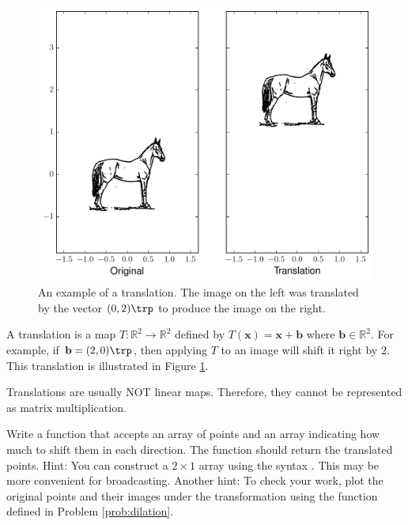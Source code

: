 \begin{figure}
\includegraphics[width=\textwidth]{translate.pdf}
\caption{
An example of a translation.
The image on the left was translated by the vector $(0, 2)\trp$ to produce the image on the right.}
\label{fig:translation}
\end{figure}

A translation is a map $T: \mathbb{R}^2 \rightarrow \mathbb{R}^2$ defined by $T(\mathbf{x}) = \mathbf{x}+\mathbf{b}$ where $\mathbf{b} \in \mathbb{R}^2$. 
For example, if $\mathbf{b} = (2, 0)\trp$, then applying $T$ to an image will shift it right by 2. 
This translation is illustrated in Figure \ref{fig:translation}.


Translations are usually NOT linear maps. 
Therefore, they cannot be represented as matrix multiplication.

\begin{problem}
Write a function that accepts an array of points and an array indicating how much to shift them in each direction. 
The function should return the translated points. 
Hint: You can construct a $2 \times 1$ array using the syntax . 
This may be more convenient for broadcasting. 
Another hint: To check your work, plot the original points and their images under the transformation using the function  defined in Problem \ref{prob:dilation}.
\end{problem}

